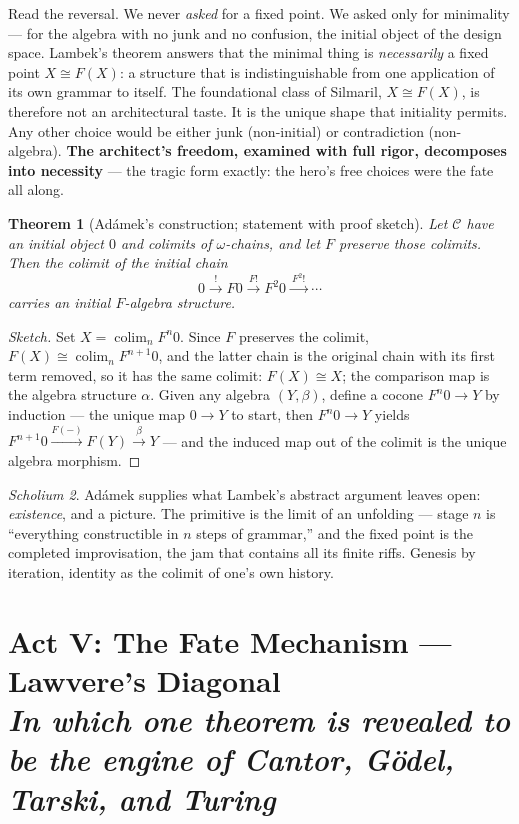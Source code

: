 \documentclass[11pt]{article}
\theoremstyle{plain}
\newtheorem{theorem}{Theorem}[section]
\theoremstyle{definition}
\theoremstyle{remark}
\newtheorem{scholium}[theorem]{Scholium}
\newcommand{\C}{\mathcal{C}}
\newcommand{\colim}{\operatorname{colim}}
\newcommand{\act}[2]{\section{#1 \\ {\normalsize\normalfont\itshape #2}}}
\begin{document}
Read the reversal. We never \emph{asked} for a fixed point. We asked only for minimality --- for the algebra with no junk and no confusion, the initial object of the design space. Lambek's theorem answers that the minimal thing is \emph{necessarily} a fixed point $X \cong F(X)$: a structure that is indistinguishable from one application of its own grammar to itself. The foundational class of Silmaril, $X \cong F(X)$, is therefore not an architectural taste. It is the unique shape that initiality permits. Any other choice would be either junk (non-initial) or contradiction (non-algebra). \textbf{The architect's freedom, examined with full rigor, decomposes into necessity} --- the tragic form exactly: the hero's free choices were the fate all along.

\begin{theorem}[Ad\'amek's construction; statement with proof sketch]\label{thm:adamek}
Let $\C$ have an initial object $0$ and colimits of $\omega$-chains, and let $F$ preserve those colimits. Then the colimit of the initial chain
\[
0 \xrightarrow{\ !\ } F0 \xrightarrow{\ F!\ } F^2 0 \xrightarrow{\ F^2!\ } \cdots
\]
carries an initial $F$-algebra structure.
\end{theorem}

\begin{proof}[Sketch]
Set $X = \colim_n F^n 0$. Since $F$ preserves the colimit, $F(X) \cong \colim_n F^{n+1}0$, and the latter chain is the original chain with its first term removed, so it has the same colimit: $F(X) \cong X$; the comparison map is the algebra structure $\alpha$. Given any algebra $(Y, \beta)$, define a cocone $F^n 0 \to Y$ by induction --- the unique map $0 \to Y$ to start, then $F^n 0 \to Y$ yields $F^{n+1}0 \xrightarrow{F(-)} F(Y) \xrightarrow{\beta} Y$ --- and the induced map out of the colimit is the unique algebra morphism.
\end{proof}

\begin{scholium}
Ad\'amek supplies what Lambek's abstract argument leaves open: \emph{existence}, and a picture. The primitive is the limit of an unfolding --- stage $n$ is ``everything constructible in $n$ steps of grammar,'' and the fixed point is the completed improvisation, the jam that contains all its finite riffs. Genesis by iteration, identity as the colimit of one's own history.
\end{scholium}

\act{Act V: The Fate Mechanism --- Lawvere's Diagonal}{In which one theorem is revealed to be the engine of Cantor, G\"odel, Tarski, and Turing}
\end{document}
